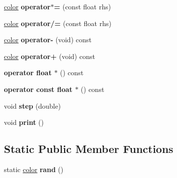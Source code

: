 \begin{DoxyCompactItemize}
\item 
\hypertarget{classmath_1_1color_a085822f33416d2fe2e3b4b2daa8bfce7}{
\hyperlink{classmath_1_1color}{color} {\bfseries operator$\ast$=} (const float rhs)}
\label{classmath_1_1color_a085822f33416d2fe2e3b4b2daa8bfce7}

\item 
\hypertarget{classmath_1_1color_aaa4bd7580527f37b1df0076b9ed21f5b}{
\hyperlink{classmath_1_1color}{color} {\bfseries operator/=} (const float rhs)}
\label{classmath_1_1color_aaa4bd7580527f37b1df0076b9ed21f5b}

\item 
\hypertarget{classmath_1_1color_ac7f3e077dd2ce911d77a8abdad7fbe86}{
\hyperlink{classmath_1_1color}{color} {\bfseries operator-\/} (void) const }
\label{classmath_1_1color_ac7f3e077dd2ce911d77a8abdad7fbe86}

\item 
\hypertarget{classmath_1_1color_a1be627af6c5487d3414ab740f33b9f80}{
\hyperlink{classmath_1_1color}{color} {\bfseries operator+} (void) const }
\label{classmath_1_1color_a1be627af6c5487d3414ab740f33b9f80}

\item 
\hypertarget{classmath_1_1color_a5a6091087373bf027d636f17ecfae2d5}{
{\bfseries operator float $\ast$} () const }
\label{classmath_1_1color_a5a6091087373bf027d636f17ecfae2d5}

\item 
\hypertarget{classmath_1_1color_ae1dced75483cba17205f9edf4a41ebbd}{
{\bfseries operator const float $\ast$} () const }
\label{classmath_1_1color_ae1dced75483cba17205f9edf4a41ebbd}

\item 
\hypertarget{classmath_1_1color_a3f8468941bc1ae18c3f16b0025cd0b4e}{
void {\bfseries step} (double)}
\label{classmath_1_1color_a3f8468941bc1ae18c3f16b0025cd0b4e}

\item 
\hypertarget{classmath_1_1color_a6235663fe419da7fd9c1dff475e1f304}{
void {\bfseries print} ()}
\label{classmath_1_1color_a6235663fe419da7fd9c1dff475e1f304}

\end{DoxyCompactItemize}
\subsection*{Static Public Member Functions}
\begin{DoxyCompactItemize}
\item 
\hypertarget{classmath_1_1color_a09ee9d39b377240e8df195553a8d8280}{
static \hyperlink{classmath_1_1color}{color} {\bfseries rand} ()}
\label{classmath_1_1color_a09ee9d39b377240e8df195553a8d8280}

\end{DoxyCompactItemize}
